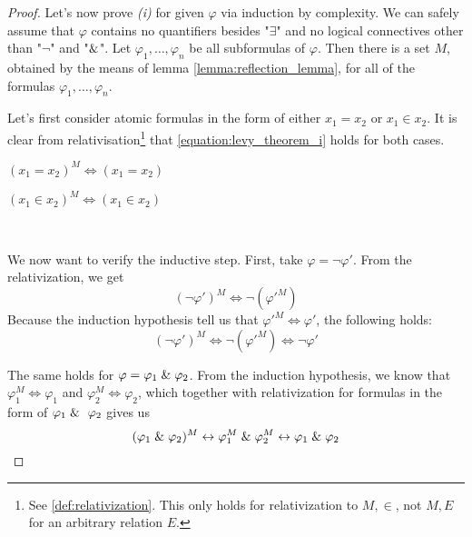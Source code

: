 \begin{proof}

Let's now prove \emph{(i)} for given $\varphi$ via induction by complexity. We can safely assume that $\varphi$ contains no quantifiers besides "$\exists$" and no logical connectives other than "$\neg$" and "$\mathrel{\&}$".
Let $\varphi_1, \ldots, \varphi_n$ be all subformulas of $\varphi$. Then there is a set $M$, obtained by the means of lemma \ref{lemma:reflection_lemma}, for all of the formulas $\varphi_1, \ldots, \varphi_n$. 

Let's first consider atomic formulas in the form of either $x_1 = x_2$ or $x_1 \in x_2$. %
It is clear from relativisation\footnote{See \ref{def:relativization}. This only holds for relativization to $M, \in$, not $M, E$ for an arbitrary relation $E$.} that \ref{equation:levy_theorem_i} holds for both cases.

\bce[(i)]
\item $(x_1 = x_2)^M \iff (x_1 = x_2)$
\item $(x_1 \in x_2)^M \iff (x_1 \in x_2)$
\ece

\

We now want to verify the inductive step. First, take $\varphi = \neg \varphi'$. From the relativization, we get
\begin{equation}
(\neg \varphi')^M \iff \neg (\varphi'^M)
\end{equation}
Because the induction hypothesis tell us that $\varphi'^M \iff \varphi'$, the following holds:
\begin{equation}
(\neg \varphi')^{M} \iff \neg (\varphi'^M) \iff \neg \varphi'
\end{equation}

The same holds for $\varphi = \varphi_1 \mathrel{\&} \varphi_2$. From the induction hypothesis, we know that $\varphi_1^M \iff \varphi_1$ and $\varphi_2^M \iff \varphi_2$, which together with relativization for formulas in the form of $\varphi_1 \et \varphi_2$ gives us
\begin{equation}
(\varphi_1 \mathrel{\&} \varphi_2)^M \leftrightarrow \varphi_1^M \mathrel{\&} \varphi_2^M \leftrightarrow \varphi_1 \mathrel{\&} \varphi_2
\end{equation}


\end{proof}
